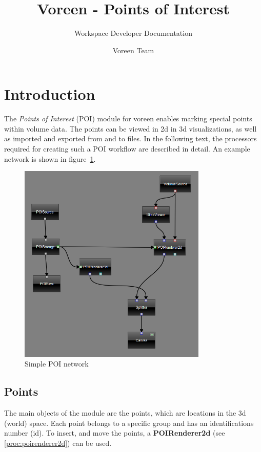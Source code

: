 \documentclass[
    fontsize=12pt,
    paper=a4,
    pagesize=auto,
    parskip=false,
    titlepage=on,
    english
]{scrartcl}
\title{Voreen - Points of Interest}
\subtitle{Workspace Developer Documentation}
\author{Voreen Team}
\begin{document}
\maketitle

\newpage
\tableofcontents

\newpage

\section{Introduction}
The \textit{Points of Interest} (POI) module for voreen\cite{voreen} enables marking special points within volume data. The points can be viewed in 2d in 3d visualizations, as well as imported and exported from and to files.
In the following text, the processors required for creating such a POI workflow are described in detail. An example network is shown in figure~\ref{fig:network}.

\begin{figure}[H]
	\centering
  \includegraphics[width=0.8\textwidth]{network.png}
	\caption{Simple POI network}
	\label{fig:network}
\end{figure}

\subsection{Points}
The main objects of the module are the points, which are locations in the 3d (world) space. Each point belongs to a specific group and has an identifications number (id). To insert, and move the points, a \textbf{POIRenderer2d} (see \ref{proc:poirenderer2d}) can be used. 
\end{document}
